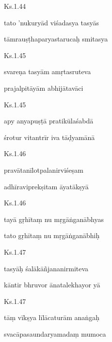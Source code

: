 \documentclass{tufte-handout}
\newenvironment{sanskrit}%
{\begin{otherlanguage}{sanskrit-devanagari}}%
{\end{otherlanguage}}
\begin{document}
    
	\begin{sanskrit}
	
	    
		Ks.1.44 
    
	    
		tato 'nukuryād viśadasya tasyās 
    
	    
		tāmrauṣṭhaparyastarucaḥ smitasya 
    
	\end{sanskrit}

    
	\begin{sanskrit}
	
	    
		Ks.1.45 
    
	    
		svareṇa tasyām amṛtasruteva 
    
	    
		prajalpitāyām abhijātavāci 
    
	\end{sanskrit}

    
	\begin{sanskrit}
	
	    
		Ks.1.45 
    
	    
		apy anyapuṣṭā pratikūlaśabdā 
    
	    
		śrotur vitantrīr iva tāḍyamānā 
    
	\end{sanskrit}

    
	\begin{sanskrit}
	
	    
		Ks.1.46 
    
	    
		pravātanīlotpalanirviśeṣam 
    
	    
		adhīraviprekṣitam āyatākṣyā 
    
	\end{sanskrit}

    
	\begin{sanskrit}
	
	    
		Ks.1.46 
    
	    
		tayā gṛhītaṃ nu mṛgāṅganābhyas 
    
	    
		tato gṛhītaṃ nu mṛgāṅganābhiḥ 
    
	\end{sanskrit}

    
	\begin{sanskrit}
	
	    
		Ks.1.47 
    
	    
		tasyāḥ śalākāñjananirmiteva 
    
	    
		kāntir bhruvor ānatalekhayor yā 
    
	\end{sanskrit}

    
	\begin{sanskrit}
	
	    
		Ks.1.47 
    
	    
		tāṃ vīkṣya līlācaturām anaṅgaḥ 
    
	    
		svacāpasaundaryamadaṃ mumoca 
    
	\end{sanskrit}
\end{document}
